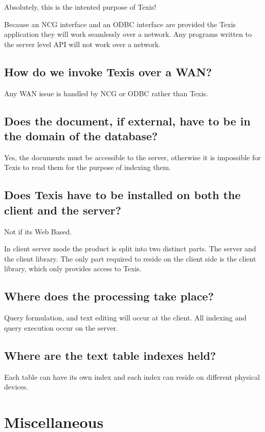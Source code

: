 Absolutely, this is the intented purpose of Texis!

Because an NCG interface and an ODBC interface are provided the Texis
application they will work seamlessly over a network.  Any programs
written to the server level API will not work over a network.

\subsection{How do we invoke Texis over a WAN?}

Any WAN issue is handled by NCG or ODBC rather than Texis.

\subsection{Does the document, if external, have to be in the domain of the
database?}

Yes, the documents must be accessible to the server, otherwise it is
impossible for Texis to read them for the purpose of indexing them.

\subsection{Does Texis have to be installed on both the client and the server?}

Not if its Web Based.

In client server mode the product is split into two distinct parts.
The server and the client
library.  The only part required to reside on the client side is the
client library, which only provides access to Texis.

\subsection{Where does the processing take place?}

Query formulation, and text editing will occur at the client.  All
indexing and query execution occur on the server.

\subsection{Where are the text table indexes held?}

Each table can have its own index and each index can reside on different
physical devices.

\section{Miscellaneous}

